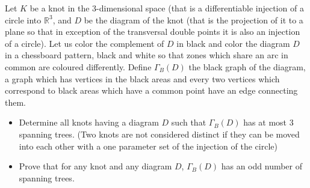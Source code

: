 Let $K$ be a knot in the $3$-dimensional space (that is a differentiable injection of a circle into $\mathbb{R}^3$, and $D$ be the diagram of the knot (that is the projection of it to a plane so that in exception of the transversal double points it is also an injection of a circle). Let us color the complement of $D$ in black and color the diagram $D$ in a chessboard pattern, black and white so that zones which share an arc in common are coloured differently. Define $\Gamma_B(D)$ the black graph of the diagram, a graph which has vertices in the black areas and every two vertices which correspond to black areas which have a common point have an edge connecting them.
\begin{itemize}
	\item Determine all knots having a diagram $D$ such that $\Gamma_B(D)$ has at most $3$ spanning trees. (Two knots are not considered distinct if they can be moved into each other with a one parameter set of the injection of the circle)
	\item Prove that for any knot and any diagram $D$, $\Gamma_B(D)$ has an odd number of spanning trees.
\end{itemize}
